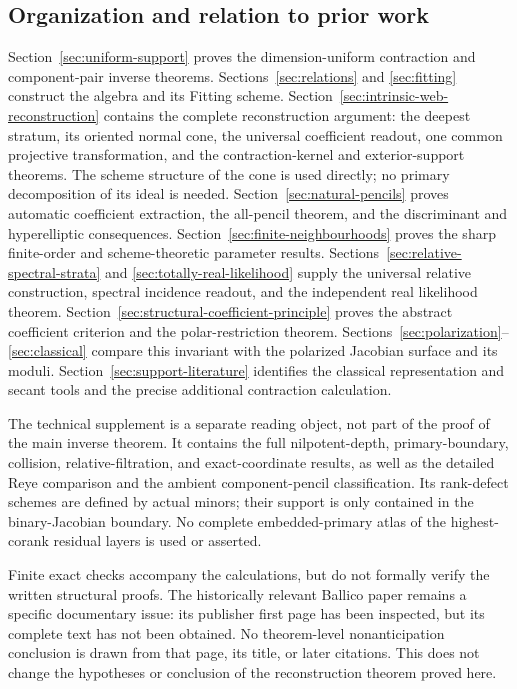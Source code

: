 \subsection{Organization and relation to prior work}

Section~\ref{sec:uniform-support} proves the dimension-uniform
contraction and component-pair inverse theorems.
Sections~\ref{sec:relations} and \ref{sec:fitting} construct the algebra
and its Fitting scheme.  Section~\ref{sec:intrinsic-web-reconstruction}
contains the complete reconstruction argument: the deepest stratum,
its oriented normal cone, the universal coefficient readout, one
common projective transformation, and the contraction-kernel and
exterior-support theorems.  The scheme structure of the cone is
used directly; no primary decomposition of its ideal is needed.
Section~\ref{sec:natural-pencils} proves automatic coefficient extraction,
the all-pencil theorem, and the discriminant and hyperelliptic
consequences.  Section~\ref{sec:finite-neighbourhoods} proves the
sharp finite-order and scheme-theoretic parameter results.  Sections~\ref{sec:relative-spectral-strata} and
\ref{sec:totally-real-likelihood} supply the universal relative
construction, spectral incidence readout, and the independent real
likelihood theorem.  Section~\ref{sec:structural-coefficient-principle} proves the abstract
coefficient criterion and the polar-restriction theorem.
Sections~\ref{sec:polarization}--\ref{sec:classical} compare this
invariant with the polarized Jacobian surface and its moduli.
Section~\ref{sec:support-literature} identifies the classical
representation and secant tools and the precise additional
contraction calculation.

The technical supplement is a separate reading object, not part of
the proof of the main inverse theorem.  It contains the full
nilpotent-depth, primary-boundary, collision, relative-filtration,
and exact-coordinate results, as well as the detailed Reye comparison
and the ambient component-pencil classification.  Its rank-defect
schemes are defined by actual minors; their support is only contained
in the binary-Jacobian boundary.  No complete embedded-primary atlas
of the highest-corank residual layers is used or asserted.

Finite exact checks accompany the calculations, but do not formally
verify the written structural proofs.  The historically relevant
Ballico paper \cite{Ballico93} remains a specific documentary issue:
its publisher first page has been inspected, but its complete text
has not been obtained.  No theorem-level nonanticipation conclusion
is drawn from that page, its title, or later citations.
This does not change the hypotheses or conclusion of the reconstruction
theorem proved here.

